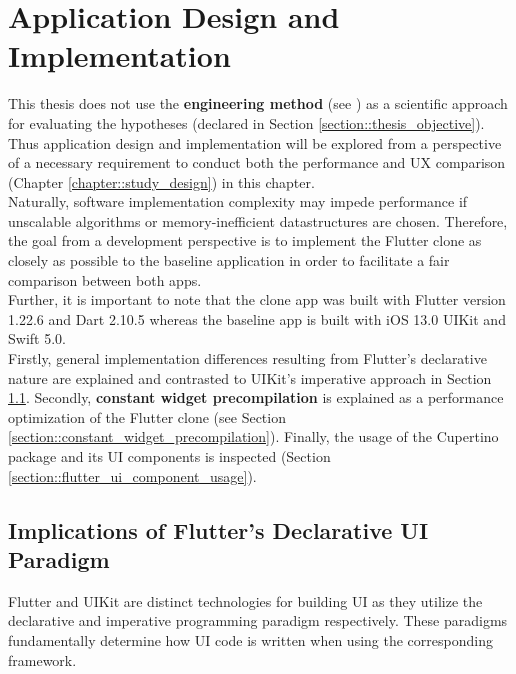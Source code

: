 \chapter{Application Design and Implementation} \label{chapter::implementation}
This thesis does not use the \textbf{engineering method} (see \cite{Ertas1996}) as a scientific approach for evaluating the hypotheses (declared in Section \ref{section::thesis_objective}).
Thus application design and implementation will be explored from a perspective of a necessary requirement to conduct both the performance and UX comparison (Chapter \ref{chapter::study_design}) in this chapter.\\
Naturally, software implementation complexity may impede performance if unscalable algorithms or memory-inefficient datastructures are chosen.
Therefore, the goal from a development perspective is to implement the Flutter clone as closely as possible to the baseline application in order to facilitate a fair comparison between both apps.\\
Further, it is important to note that the clone app was built with Flutter version 1.22.6 and Dart 2.10.5 whereas the baseline app is built with iOS 13.0 UIKit and Swift 5.0.\\
Firstly, general implementation differences resulting from Flutter's declarative nature are explained and contrasted to UIKit's imperative approach in Section \ref{section::declarative_vs_imperative_ui}.
Secondly, \textbf{constant widget precompilation} is explained as a performance optimization of the Flutter clone (see Section \ref{section::constant_widget_precompilation}).
Finally, the usage of the Cupertino package and its UI components is inspected (Section \ref{section::flutter_ui_component_usage}). 


\section{Implications of Flutter's Declarative UI Paradigm} \label{section::declarative_vs_imperative_ui}
Flutter and UIKit are distinct technologies for building UI as they utilize the declarative and imperative programming paradigm respectively. 
These paradigms fundamentally determine how UI code is written when using the corresponding framework.\\

